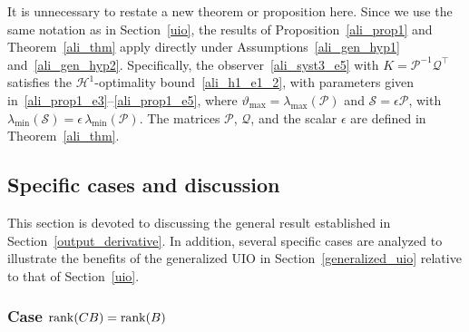 It is unnecessary to restate a new theorem or proposition here. Since we use the same notation as in Section~\ref{uio}, the results of Proposition~\ref{ali_prop1} and Theorem~\ref{ali_thm} apply directly under Assumptions~\ref{ali_gen_hyp1} and~\ref{ali_gen_hyp2}. 
Specifically, the observer~\eqref{ali_syst3_e5} with $ K = \mathcal{P}^{-1}\mathcal{Q}^{\top} $ satisfies the $\mathcal{H}^{1}$-optimality bound~\eqref{ali_h1_e1_2}, with parameters given in~\eqref{ali_prop1_e3}--\eqref{ali_prop1_e5}, where $\vartheta_{\max} = \lambda_{\max}\!\left( \mathcal{P} \right)$ and $\mathcal{S} = \epsilon \mathcal{P}$, with $\lambda_{\min}\!\left( \mathcal{S} \right) 
= \epsilon\, \lambda_{\min}\!\left( \mathcal{P} \right)$. The matrices $\mathcal{P}$, $\mathcal{Q}$, and the scalar $\epsilon$ are defined in Theorem~\ref{ali_thm}.










\subsection{Specific cases and discussion}
This section is devoted to discussing the general result established in Section~\ref{output_derivative}. In addition, several specific cases are analyzed to illustrate the benefits of the generalized UIO in Section~\ref{generalized_uio} relative to that of Section~\ref{uio}.


\subsubsection{Case $\mathop{{\rm rank}}(CB) =\mathop{{\rm rank}}(B)$}

